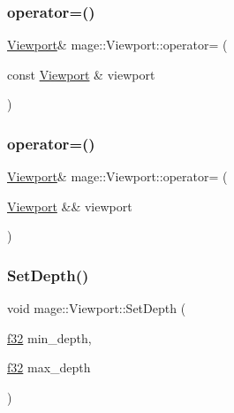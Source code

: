 \hypertarget{structmage_1_1_viewport_ab06320c545dd9b71d17e7f8c92fb693c}{}\label{structmage_1_1_viewport_ab06320c545dd9b71d17e7f8c92fb693c} 
\subsubsection{\texorpdfstring{operator=()}{operator=()}\hspace{0.1cm}{\footnotesize\ttfamily [1/2]}}
{\footnotesize\ttfamily \hyperlink{structmage_1_1_viewport}{Viewport}\& mage\+::\+Viewport\+::operator= (\begin{DoxyParamCaption}\item[{const \hyperlink{structmage_1_1_viewport}{Viewport} \&}]{viewport }\end{DoxyParamCaption})\hspace{0.3cm}{\ttfamily [default]}}

\hypertarget{structmage_1_1_viewport_a83ef22f5db0991bc540372d37905524d}{}\label{structmage_1_1_viewport_a83ef22f5db0991bc540372d37905524d} 
\subsubsection{\texorpdfstring{operator=()}{operator=()}\hspace{0.1cm}{\footnotesize\ttfamily [2/2]}}
{\footnotesize\ttfamily \hyperlink{structmage_1_1_viewport}{Viewport}\& mage\+::\+Viewport\+::operator= (\begin{DoxyParamCaption}\item[{\hyperlink{structmage_1_1_viewport}{Viewport} \&\&}]{viewport }\end{DoxyParamCaption})\hspace{0.3cm}{\ttfamily [default]}}

\hypertarget{structmage_1_1_viewport_a1cec151634662ec11fa01f20e06fa04b}{}\label{structmage_1_1_viewport_a1cec151634662ec11fa01f20e06fa04b} 
\subsubsection{\texorpdfstring{Set\+Depth()}{SetDepth()}}
{\footnotesize\ttfamily void mage\+::\+Viewport\+::\+Set\+Depth (\begin{DoxyParamCaption}\item[{\hyperlink{namespacemage_a6a44ad388483959dc4dff9f2aef91431}{f32}}]{min\+\_\+depth,  }\item[{\hyperlink{namespacemage_a6a44ad388483959dc4dff9f2aef91431}{f32}}]{max\+\_\+depth }\end{DoxyParamCaption})\hspace{0.3cm}{\ttfamily [noexcept]}}

